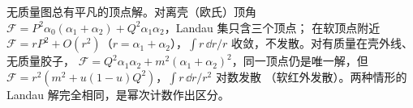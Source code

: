 \begin{remark}[必要而非充分]
无质量图总有平凡的顶点解。对离壳（欧氏）顶角 $\mathcal F=P^2\alpha_0(\alpha_1+\alpha_2)+Q^2\alpha_1\alpha_2$，Landau 集只含三个顶点；
在软顶点附近 $\mathcal F=rP^2+O(r^2)$（$r=\alpha_1+\alpha_2$），$\int r\,\dd r/r$ 收敛，不发散。对有质量在壳外线、无质量胶子，
$\mathcal F=Q^2\alpha_1\alpha_2+m^2(\alpha_1+\alpha_2)^2$，同一顶点仍是唯一解，但 $\mathcal F=r^2(m^2+u(1-u)Q^2)$，$\int r\,\dd r/r^2$ 对数发散
（软红外发散）。两种情形的 Landau 解完全相同，是幂次计数作出区分。
\end{remark}
